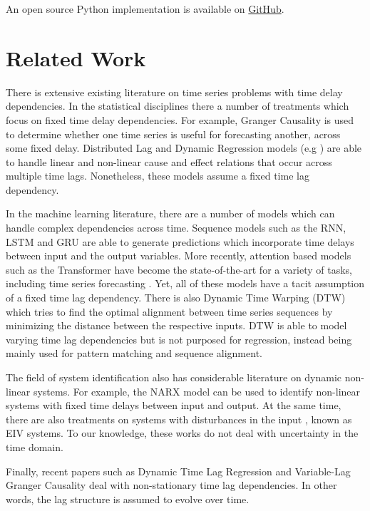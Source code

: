 \documentclass[11pt]{amsart}
\theoremstyle{definition}
\begin{document}
An open source Python implementation is available on \href{https://github.com/aaron1rcl/tvs_regression/}{GitHub}.

\section{Related Work}
There is extensive existing literature on time series problems with time delay dependencies. In the statistical disciplines there a number of treatments which focus on 
fixed time delay dependencies. For example, Granger Causality \cite{granger} is used to determine whether one time series is useful for forecasting another, across some fixed delay.
Distributed Lag \cite{almon} and Dynamic Regression models (e.g \cite{dynr}) are able to handle linear and non-linear cause and effect relations that occur across multiple time lags.
Nonetheless, these models assume a fixed time lag dependency.

In the machine learning literature, there are a number of models which can handle complex dependencies across time. Sequence models such as the RNN, LSTM and GRU \cite{ml}
are able to generate predictions which incorporate time delays between input and the output variables. More recently, attention based models such as the Transformer have become the state-of-the-art for a
variety of tasks, including time series forecasting \cite{deep_transformers}. Yet, all of these models have a tacit assumption of a fixed time lag dependency. There is also Dynamic Time Warping (DTW) \cite{dtw} which tries to find the optimal alignment between time series sequences by minimizing the
distance between the respective inputs. DTW is able to model varying time lag dependencies but is not purposed for regression, instead being mainly used for pattern matching and sequence alignment.

The field of system identification also has considerable literature on dynamic non-linear systems. For example, the NARX \cite{ml} model can be used to identify 
non-linear systems with fixed time delays between input and output. At the same time, there are also treatments on systems with disturbances in the input \cite{eiv_sysid}, known as EIV systems. To our knowledge,
these works do not deal with uncertainty in the time domain.

Finally, recent papers such as Dynamic Time Lag Regression \cite{dtlr} and Variable-Lag Granger Causality \cite{Amornbunchornvej_2019} deal with non-stationary time lag dependencies. In other words, the lag structure is assumed to evolve over time.
\end{document}
